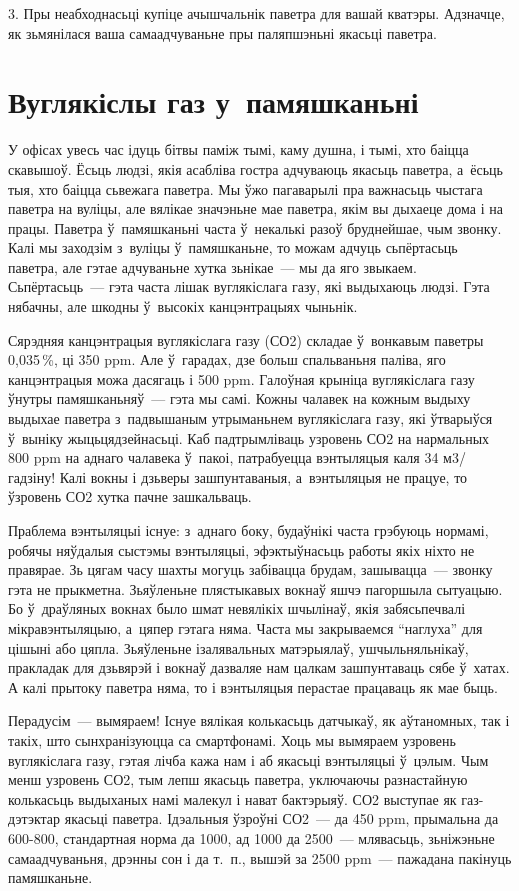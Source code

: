 3. Пры неабходнасьці купіце ачышчальнік паветра для вашай кватэры. Адзначце, як зьмянілася ваша самаадчуваньне пры паляпшэньні якасьці паветра.


\section{Вуглякіслы газ у~памяшканьні}

У офісах увесь час ідуць бітвы паміж тымі, каму душна, і тымі, хто баіцца скавышоў. Ёсьць людзі, якія асабліва гостра адчуваюць якасьць паветра, а~ёсьць тыя, хто баіцца сьвежага паветра. Мы ўжо пагаварылі пра важнасьць чыстага паветра на вуліцы, але вялікае значэньне мае паветра, якім вы дыхаеце дома і на працы. Паветра ў~памяшканьні часта ў~некалькі разоў бруднейшае, чым звонку. Калі мы заходзім з~вуліцы ў~памяшканьне, то можам адчуць сьпёртасьць паветра, але гэтае адчуваньне хутка зьнікае~--- мы да яго звыкаем. Сьпёртасьць~--- гэта часта лішак вуглякіслага газу, які выдыхаюць людзі. Гэта нябачны, але шкодны ў~высокіх канцэнтрацыях чыньнік.

Сярэдняя канцэнтрацыя вуглякіслага газу (СО2) складае ў~вонкавым паветры 0,035\,\%, ці 350 ppm. Але ў~гарадах, дзе больш спальваньня паліва, яго канцэнтрацыя можа дасягаць і 500 ppm. Галоўная крыніца вуглякіслага газу ўнутры памяшканьняў~--- гэта мы самі. Кожны чалавек на кожным выдыху выдыхае паветра з~падвышаным утрыманьнем вуглякіслага газу, які ўтварыўся ў~выніку жыцьцядзейнасьці. Каб падтрымліваць узровень СО2 на нармальных 800 ppm на аднаго чалавека ў~пакоі, патрабуецца вэнтыляцыя каля 34 м3/гадзіну! Калі вокны і дзьверы зашпунтаваныя, а~вэнтыляцыя не працуе, то ўзровень СО2 хутка пачне зашкальваць.

Праблема вэнтыляцыі існуе: з~аднаго боку, будаўнікі часта грэбуюць нормамі, робячы няўдалыя сыстэмы вэнтыляцыі, эфэктыўнасьць работы якіх ніхто не правярае. Зь цягам часу шахты могуць забівацца брудам, зашывацца~--- звонку гэта не прыкметна. Зьяўленьне плястыкавых вокнаў яшчэ пагоршыла сытуацыю. Бо ў~драўляных вокнах было шмат невялікіх шчылінаў, якія забясьпечвалі мікравэнтыляцыю, а~цяпер гэтага няма. Часта мы закрываемся ``наглуха'' для цішыні або цяпла. Зьяўленьне ізалявальных матэрыялаў, ушчыльняльнікаў, пракладак для дзьвярэй і вокнаў дазваляе нам цалкам зашпунтаваць сябе ў~хатах. А калі прытоку паветра няма, то і вэнтыляцыя перастае працаваць як мае быць.

Перадусім~--- вымяраем! Існуе вялікая колькасьць датчыкаў, як аўтаномных, так і такіх, што сынхранізуюцца са смартфонамі. Хоць мы вымяраем узровень вуглякіслага газу, гэтая лічба кажа нам і аб якасьці вэнтыляцыі ў~цэлым. Чым менш узровень СО2, тым лепш якасьць паветра, уключаючы разнастайную колькасьць выдыханых намі малекул і нават бактэрыяў. СО2 выступае як газ-дэтэктар якасьці паветра. Ідэальныя ўзроўні СО2~--- да 450 ppm, прымальна да 600-800, стандартная норма да 1000, ад 1000 да 2500~--- млявасьць, зьніжэньне самаадчуваньня, дрэнны сон і да т.~п., вышэй за 2500 ppm~--- пажадана пакінуць памяшканьне.

